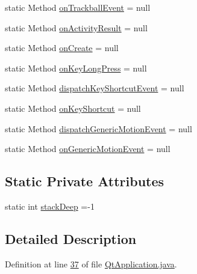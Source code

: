 \begin{DoxyCompactItemize}
$$static Method \hyperlink{classorg_1_1kde_1_1necessitas_1_1origo_1_1_qt_application_aa3d5068cdf9e6a4a3163e3810908fef7}{on\-Trackball\-Event} = null
\item 
static Method \hyperlink{classorg_1_1kde_1_1necessitas_1_1origo_1_1_qt_application_add9ee10c3ded40d66ef7d8ce6d4d1aef}{on\-Activity\-Result} = null
\item 
static Method \hyperlink{classorg_1_1kde_1_1necessitas_1_1origo_1_1_qt_application_af48a7b3b90f3b9977d4968e4d9dea8dc}{on\-Create} = null
\item 
static Method \hyperlink{classorg_1_1kde_1_1necessitas_1_1origo_1_1_qt_application_a1f77504534fe0f052fb86e5410b2235f}{on\-Key\-Long\-Press} = null
\item 
static Method \hyperlink{classorg_1_1kde_1_1necessitas_1_1origo_1_1_qt_application_a4a5361e0ccac0f7a8890dd2fed6f6d20}{dispatch\-Key\-Shortcut\-Event} = null
\item 
static Method \hyperlink{classorg_1_1kde_1_1necessitas_1_1origo_1_1_qt_application_a98b2c8ed32427b53f59310a81ca43b48}{on\-Key\-Shortcut} = null
\item 
static Method \hyperlink{classorg_1_1kde_1_1necessitas_1_1origo_1_1_qt_application_a3cbf08100c28cac6537d5f2692d5294c}{dispatch\-Generic\-Motion\-Event} = null
\item 
static Method \hyperlink{classorg_1_1kde_1_1necessitas_1_1origo_1_1_qt_application_a8b387a48af075841808ff0a6b6821f38}{on\-Generic\-Motion\-Event} = null
\end{DoxyCompactItemize}
\subsection*{Static Private Attributes}
\begin{DoxyCompactItemize}
\item 
static int \hyperlink{classorg_1_1kde_1_1necessitas_1_1origo_1_1_qt_application_ab072f0cec7e921c7decb2aa1d532fea3}{stack\-Deep} =-\/1
\end{DoxyCompactItemize}


\subsection{Detailed Description}


Definition at line \hyperlink{_qt_application_8java_source_l00037}{37} of file \hyperlink{_qt_application_8java_source}{Qt\-Application.\-java}.



